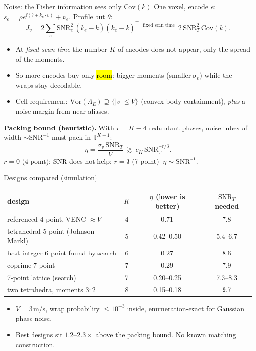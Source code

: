 \begin{frame}{Noise: the Fisher information sees only $\mathrm{Cov}(k)$}
\small
One voxel, encode $e$: $s_e=\rho e^{\ii(\theta+k_e\cdot v)}+n_e$. Profile out $\theta$:
\[ J_v=2\sum_e\mathrm{SNR}_e^{2}\,(k_e-\bar k)(k_e-\bar k)^{\!\top}\ \overset{\text{fixed scan time}}{=}\ 2\,\mathrm{SNR}_T^{2}\,\mathrm{Cov}(k). \]
\pause
\begin{itemize}
\item At \emph{fixed scan time} the number $K$ of encodes does not appear, only the spread of the moments.
\item So more encodes buy only \hl{room}: bigger moments (smaller $\sigma_v$) while the wraps stay decodable.
\item Cell requirement: $\mathrm{Vor}(\Lambda_E)\supseteq\{|v|\le V\}$ (convex-body containment), \emph{plus} a noise margin from near-aliases.
\end{itemize}
\pause
\textbf{Packing bound (heuristic).} With $r=K-4$ redundant phases, noise tubes of width $\sim\mathrm{SNR}^{-1}$ must pack in $\mathbb T^{K-1}$:
\[ \eta=\frac{\sigma_{v}\,\mathrm{SNR}_T}{V}\ \gtrsim\ c_K\,\mathrm{SNR}_T^{-r/3}. \]
$r=0$ (4-point): SNR does not help; $r=3$ (7-point): $\eta\sim\mathrm{SNR}^{-1}$.
\end{frame}

\begin{frame}{Designs compared (simulation)}
\small
\centering
\begin{tabular}{@{}lccc@{}}\toprule
design & $K$ & $\eta$ (lower is better) & $\mathrm{SNR}_T$ needed\\\midrule
referenced 4-point, VENC $\approx V$ & 4 & 0.71 & 7.8\\
tetrahedral 5-point (Johnson--Markl) & 5 & 0.42--0.50 & 5.4--6.7\\
best integer 6-point found by search & 6 & 0.27 & 8.6\\
coprime 7-point & 7 & 0.29 & 7.9\\
7-point lattice (search) & 7 & 0.20--0.25 & 7.3--8.3\\
two tetrahedra, moments $3{:}2$ & 8 & 0.15--0.18 & 9.7\\\bottomrule
\end{tabular}
\medskip
\begin{itemize}\small
\item $V=3$\,m/s, wrap probability $\le10^{-3}$ inside, enumeration-exact for Gaussian phase noise.
\item Best designs sit $1.2$--$2.3\times$ above the packing bound. No known matching construction.
\end{itemize}
\end{frame}

